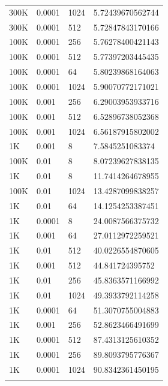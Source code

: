 \begin{table}[th]
\begin{tabular}{llll}
300K    & 0.0001 & 1024  & 5.72439670562744  \\ 
300K    & 0.0001 & 512   & 5.72847843170166  \\ 
100K    & 0.0001 & 256   & 5.76278400421143  \\ 
100K    & 0.0001 & 512   & 5.77397203445435  \\ 
100K    & 0.0001 & 64    & 5.80239868164063  \\ 
100K    & 0.0001 & 1024  & 5.90070772171021  \\ 
100K    & 0.001  & 256   & 6.29003953933716  \\ 
100K    & 0.001  & 512   & 6.52896738052368  \\ 
100K    & 0.001  & 1024  & 6.56187915802002  \\ 
1K      & 0.001  & 8     & 7.5845251083374   \\ 
100K    & 0.01   & 8     & 8.07239627838135  \\ 
1K      & 0.01   & 8     & 11.7414264678955  \\ 
100K    & 0.01   & 1024  & 13.4287099838257  \\ 
1K      & 0.01   & 64    & 14.1254253387451  \\ 
1K      & 0.0001 & 8     & 24.0087566375732  \\ 
1K      & 0.001  & 64    & 27.0112972259521  \\ 
1K      & 0.01   & 512   & 40.0226554870605  \\ 
1K      & 0.001  & 512   & 44.841724395752   \\ 
1K      & 0.01   & 256   & 45.8363571166992  \\ 
1K      & 0.01   & 1024  & 49.3933792114258  \\ 
1K      & 0.0001 & 64    & 51.3070755004883  \\ 
1K      & 0.001  & 256   & 52.8623466491699  \\ 
1K      & 0.0001 & 512   & 87.4313125610352  \\ 
1K      & 0.0001 & 256   & 89.8093795776367  \\ 
1K      & 0.0001 & 1024  & 90.8342361450195  \\ 
\bottomrule\\
\end{tabular}
\end{table}


